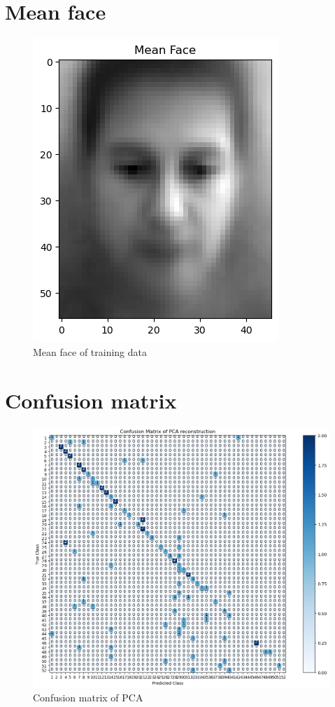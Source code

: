 \section{Mean face}
\begin{figure}[H]
  \centering
   \includegraphics[width=0.8\linewidth]{image/q1_meanface.png} %

   \caption{Mean face of training data}
   \label{fig:q1_meanface}
\end{figure}


\section{Confusion matrix}
\begin{figure}[H]
  \centering
   \includegraphics[width=0.8\linewidth]{image/q1_cm.png} %

   \caption{Confusion matrix of PCA}
   \label{fig:q1_cm}
\end{figure}

